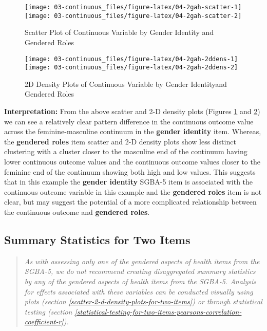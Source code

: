 \documentclass[
]{book}
\begin{document}
\begin{figure}

{\centering \texttt{[image: 03-continuous\_files/figure-latex/04-2gah-scatter-1]} \texttt{[image: 03-continuous\_files/figure-latex/04-2gah-scatter-2]} 

}

\caption{Scatter Plot of Continuous Variable by Gender Identity and Gendered Roles}\label{fig:04-2gah-scatter}
\end{figure}

\begin{figure}

{\centering \texttt{[image: 03-continuous\_files/figure-latex/04-2gah-2ddens-1]} \texttt{[image: 03-continuous\_files/figure-latex/04-2gah-2ddens-2]} 

}

\caption{2D Density Plots of Continuous Variable by Gender Identityand Gendered Roles}\label{fig:04-2gah-2ddens}
\end{figure}

\textbf{Interpretation:} From the above scatter and 2-D density plots (Figures \ref{fig:04-2gah-scatter} and \ref{fig:04-2gah-2ddens}) we can see a relatively clear pattern difference in the continuous outcome value across the feminine-masculine continuum in the \textbf{gender identity} item. Whereas, the \textbf{gendered roles} item scatter and 2-D density plots show less distinct clustering with a cluster closer to the masculine end of the continuum having lower continuous outcome values and the continuous outcome values closer to the feminine end of the continuum showing both high and low values. This suggests that in this example the \textbf{gender identity} SGBA-5 item is associated with the continuous outcome variable in this example and the \textbf{gendered roles} item is not clear, but may suggest the potential of a more complicated relationship between the continuous outcome and \textbf{gendered roles}.

\subsection{Summary Statistics for Two Items}\label{summary-statistics-for-two-items}

\begin{quote}
\emph{As with assessing only one of the gendered aspects of health items from the SGBA-5, we do not recommend creating disaggregated summary statistics by any of the gendered aspects of health items from the SGBA-5. Analysis for effects associated with these variables can be conducted visually using plots (section \ref{scatter-2-d-density-plots-for-two-items}) or through statistical testing (section \ref{statistical-testing-for-two-items-pearsons-correlation-coefficient-r}).}
\end{quote}
\end{document}
